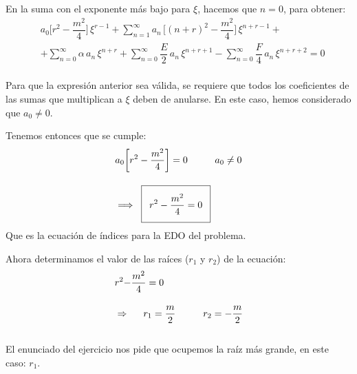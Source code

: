 En la suma con el exponente más bajo para $\xi$, hacemos que $n = 0$, para obtener:
\begin{align*}
&{} a_{0} \bigg[ r^{2} {-} \dfrac{m^{2}}{4} \bigg] \, \xi^{r-1} + \sum_{n=1}^{\infty} a_{n} \, \bigg[ (n {+} r)^{2} {-} \dfrac{m^{2}}{4} \bigg] \, \xi^{n+r-1} + \\[1em] 
&+  \sum_{n=0}^{\infty} \alpha \, a_{n} \, \xi^{n+r} + \sum_{n=0}^{\infty} \dfrac{E}{2} \, a_{n} \, \xi^{n+r+1} - \sum_{n=0}^{\infty} \dfrac{F}{4} \, a_{n} \, \xi^{n+r+2} = 0
\end{align*}    
\\
Para que la expresión anterior sea válida, se requiere que todos los coeficientes de las sumas que multiplican a $\xi$ deben de anularse. En este caso, hemos considerado que $a_{0} \neq 0$.
\par
Tenemos entonces que se cumple:
\begin{align*}
&{} a_{0} \bigg[ r^{2} - \dfrac{m^{2}}{4} \bigg] = 0 \hspace{1cm} a_{0} \neq 0 \\[1em]
&{} \Longrightarrow \hspace{0.2cm} \addtolength{\fboxsep}{5pt}\boxed{ r^{2} - \dfrac{m^{2}}{4} = 0}
\end{align*}
Que es la ecuación de índices para la EDO del problema.

\par
Ahora determinamos el valor de las raíces ($r_{1}$ y $r_{2}$) de la ecuación:
\begin{align*}
&{} r^{2} {-} \dfrac{m^{2}}{4} = 0 \\[1em]
&\Rightarrow \hspace{0.5cm} r_{1} = \dfrac{m}{2} \hspace{1cm} r_{2} = -\dfrac{m}{2}
\end{align*}
\\
El enunciado del ejercicio nos pide que ocupemos la raíz más grande, en este caso: $r_{1}$.

